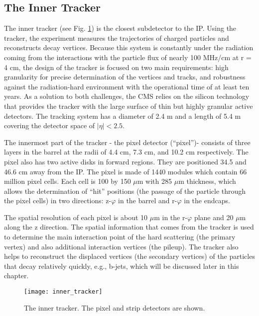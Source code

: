 \begin{normalsize}

\subsection{The Inner Tracker}

The inner tracker \cite{Tracker_phase2} (see Fig. \ref{inner_tracker}) is the closest subdetector to the IP. Using the tracker, the experiment measures the trajectories of charged particles and reconstructs decay vertices. Because this system is constantly under the radiation coming from the interactions with the particle flux of nearly 100 MHz/cm at r = 4 cm, the design of the tracker is focused on two main requirements: high granularity for precise determination of the vertices and tracks, and robustness against the radiation-hard environment with the operational time of at least ten years. As a solution to both challenges, the CMS relies on the silicon technology that provides the tracker with the large surface of thin but highly granular active detectors. The tracking system has a diameter of 2.4 m and a length of 5.4 m covering the detector space of $|\eta|< 2.5$. 

The innermost part of the tracker - the pixel detector (``pixel'')- consists of three layers in the barrel at the radii of 4.4 cm, 7.3 cm, and 10.2 cm respectively. The pixel also has two active disks in forward regions. They are positioned 34.5 and 46.6 cm away from the IP. The pixel is made of 1440 modules which contain 66 million pixel cells. Each cell is 100 by 150 $\mu$m with 285 $\mu$m thickness, which allows the determination of ``hit'' positions (the passage of the particle through the pixel cells) in two directions: z-$\varphi$ in the barrel and r-$\varphi$ in the endcaps.

The spatial resolution of each pixel is about 10 $\mu$m in the r-$\varphi$ plane and 20 $\mu$m along the z direction. The spatial information that comes from the tracker is used to determine the main interaction point of the hard scattering (the primary vertex) and also additional interaction vertices (the pileup). The tracker also helps to reconstruct the displaced vertices (the secondary vertices) of the particles that decay relatively quickly, e.g., b-jets, which will be discussed later in this chapter. 




\begin{figure}[h!]
  \centering
  \texttt{[image: inner\_tracker]}
  \caption[The inner tracker]{The inner tracker. The pixel and strip detectors are shown. }
  \label{inner_tracker}
\end{figure}



\end{normalsize}
